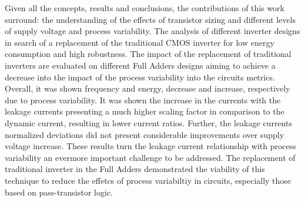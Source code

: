 \documentclass[pgmicro,diss,english]{iiufrgs}
\begin{document}
\begin{table}[]
\centering
\caption{Current results for the FAs considering the product between measures and deviations for dynamic and static currents.}
\label{tab:FACurr}
\end{table}

Given all the concepts, results and conclusions, the contributions of this work surround: the understanding of the effects of transistor sizing and different levels of supply voltage and process variability. The analysis of different inverter designs in search of a replacement of the traditional CMOS inverter for low energy consumption and high robustness. The impact of the replacement of traditional inverters are evaluated on different Full Adders designs aiming to achieve a decrease into the impact of the process variability into the circuits metrics. Overall, it was shown frequency and energy, decrease and increase, respectively due to process variability. It was shown the increase in the currents with the leakage currents presenting a much higher scaling factor in comparison to the dynamic current, resulting in lower current ratios. Further, the leakage currents normalized deviations did not present considerable improvements over supply voltage increase. These results turn the leakage current relationship with process variability an evermore important challenge to be addressed. The replacement of traditional inverter in the Full Adders demonstrated the viability of this technique to reduce the effetcs of process variabiltiy in circuits, especially those based on pass-transistor logic.
\end{document}
